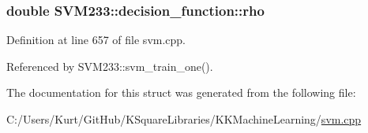 \subsubsection[{\texorpdfstring{rho}{rho}}]{\setlength{\rightskip}{0pt plus 5cm}double S\+V\+M233\+::decision\+\_\+function\+::rho}\hypertarget{struct_s_v_m233_1_1decision__function_a00836384c2f15ce44ec0802a82cd6b8f}{}\label{struct_s_v_m233_1_1decision__function_a00836384c2f15ce44ec0802a82cd6b8f}


Definition at line 657 of file svm.\+cpp.



Referenced by S\+V\+M233\+::svm\+\_\+train\+\_\+one().



The documentation for this struct was generated from the following file\+:\begin{DoxyCompactItemize}
\item 
C\+:/\+Users/\+Kurt/\+Git\+Hub/\+K\+Square\+Libraries/\+K\+K\+Machine\+Learning/\hyperlink{svm_8cpp}{svm.\+cpp}\end{DoxyCompactItemize}
